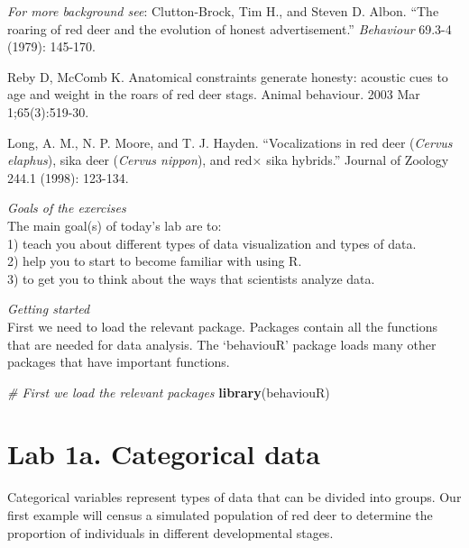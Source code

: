 \documentclass[]{book}
\newenvironment{Shaded}{\begin{snugshade}}{\end{snugshade}}
\newcommand{\CommentTok}[1]{\textcolor[rgb]{0.56,0.35,0.01}{\textit{#1}}}
\newcommand{\KeywordTok}[1]{\textcolor[rgb]{0.13,0.29,0.53}{\textbf{#1}}}
\newcommand{\NormalTok}[1]{#1}
\begin{document}
\emph{For more background see}:
Clutton-Brock, Tim H., and Steven D. Albon. ``The roaring of red deer and the evolution of honest advertisement.'' \emph{Behaviour} 69.3-4 (1979): 145-170.

Reby D, McComb K. Anatomical constraints generate honesty: acoustic cues to age and weight in the roars of red deer stags. Animal behaviour. 2003 Mar 1;65(3):519-30.

Long, A. M., N. P. Moore, and T. J. Hayden. ``Vocalizations in red deer (\emph{Cervus elaphus}), sika deer (\emph{Cervus nippon}), and red× sika hybrids.'' Journal of Zoology 244.1 (1998): 123-134.

\emph{Goals of the exercises}\\
The main goal(s) of today's lab are to:\\
1) teach you about different types of data visualization and types of data.\\
2) help you to start to become familiar with using R.\\
3) to get you to think about the ways that scientists analyze data.

\emph{Getting started}\\
First we need to load the relevant package. Packages contain all the functions that are needed for data analysis. The `behaviouR' package loads many other packages that have important functions.

\begin{Shaded}
\begin{Highlighting}[]
\CommentTok{# First we load the relevant packages}
\KeywordTok{library}\NormalTok{(behaviouR)}
\end{Highlighting}
\end{Shaded}

\hypertarget{lab-1a.-categorical-data}{%
\section*{Lab 1a. Categorical data}\label{lab-1a.-categorical-data}}

Categorical variables represent types of data that can be divided into groups.
Our first example will census a simulated population of red deer to determine the proportion of individuals in different developmental stages.
\end{document}
